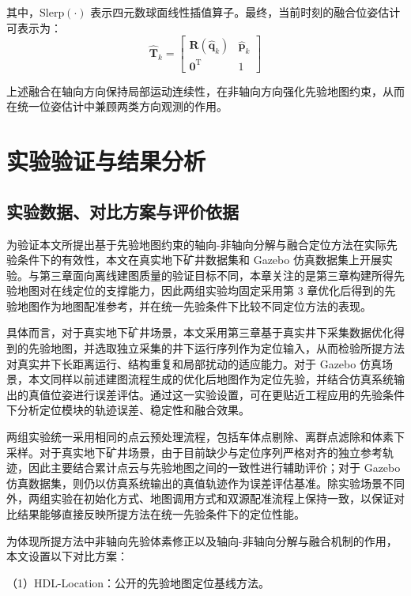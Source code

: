 其中，$\mathrm{Slerp}(\cdot)$ 表示四元数球面线性插值算子。最终，当前时刻的融合位姿估计可表示为：
\begin{equation}
\hat{\mathbf{T}}_{k}
=
\begin{bmatrix}
\mathbf{R}\left(\hat{\mathbf{q}}_{k}\right) & \hat{\mathbf{p}}_{k}\\
\mathbf{0}^{\mathrm T} & 1
\end{bmatrix}
\end{equation}

上述融合在轴向方向保持局部运动连续性，在非轴向方向强化先验地图约束，从而在统一位姿估计中兼顾两类方向观测的作用。

\section{实验验证与结果分析}

\subsection{实验数据、对比方案与评价依据}

为验证本文所提出基于先验地图约束的轴向-非轴向分解与融合定位方法在实际先验条件下的有效性，本文在真实地下矿井数据集和 Gazebo 仿真数据集上开展实验。与第三章面向离线建图质量的验证目标不同，本章关注的是第三章构建所得先验地图对在线定位的支撑能力，因此两组实验均固定采用第 3 章优化后得到的先验地图作为地图配准参考，并在统一先验条件下比较不同定位方法的表现。

具体而言，对于真实地下矿井场景，本文采用第三章基于真实井下采集数据优化得到的先验地图，并选取独立采集的井下运行序列作为定位输入，从而检验所提方法对真实井下长距离运行、结构重复和局部扰动的适应能力。对于 Gazebo 仿真场景，本文同样以前述建图流程生成的优化后地图作为定位先验，并结合仿真系统输出的真值位姿进行误差评估。通过这一实验设置，可在更贴近工程应用的先验条件下分析定位模块的轨迹误差、稳定性和融合效果。

两组实验统一采用相同的点云预处理流程，包括车体点剔除、离群点滤除和体素下采样。对于真实地下矿井场景，由于目前缺少与定位序列严格对齐的独立参考轨迹，因此主要结合累计点云与先验地图之间的一致性进行辅助评价；对于 Gazebo 仿真数据集，则仍以仿真系统输出的真值轨迹作为误差评估基准。除实验场景不同外，两组实验在初始化方式、地图调用方式和双源配准流程上保持一致，以保证对比结果能够直接反映所提方法在统一先验条件下的定位性能。

为体现所提方法中非轴向先验体素修正以及轴向-非轴向分解与融合机制的作用，本文设置以下对比方案：

（1）HDL-Location：公开的先验地图定位基线方法。

